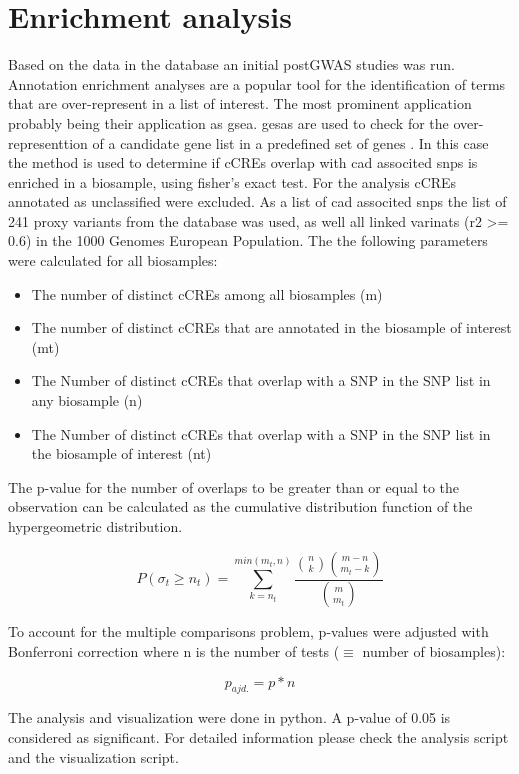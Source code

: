 \section{Enrichment analysis}
\label{sec:enrichment}
Based on the data in the database an initial postGWAS studies was run. Annotation enrichment analyses are a popular tool for the identification of terms that are over-represent in a list of interest. The most prominent application probably being their application as \ac{gsea}. \acp{gesa} are used to check for the over-representtion of a candidate gene list in a predefined set of genes \cite{tipneyIntroductionEffectiveUse2010}. In this case the method is used to determine if \acp{cCRE} overlap with \ac{cad} associted \acp{snp} is enriched in a biosample, using fisher's exact test.
For the analysis \acp{cCRE} annotated as unclassified were excluded. As a list of \ac{cad} associted \acp{snp} the list of 241 proxy variants from the database was used, as well all linked varinats (r2 >= 0.6) in the 1000 Genomes European Population. The the following parameters were calculated for all biosamples:

\begin{itemize}
    \item The number of distinct cCREs among all biosamples (m)
    \item The number of distinct cCREs that are annotated in the biosample of interest (mt)
    \item The Number of distinct cCREs that overlap with a SNP in the SNP list in any biosample (n)
    \item The Number of distinct cCREs that overlap with a SNP in the SNP list in the biosample of interest (nt)
\end{itemize}

The p-value for the number of overlaps to be greater than or equal to the observation can be calculated as the cumulative distribution function of the hypergeometric distribution.

$$ P(\sigma_t\geq n_t) = \sum_{k=n_t}^{min(m_t, n)} \frac{\binom{n}{k}\binom{m-n}{m_t-k}}{\binom{m}{m_t}} $$

To account for the multiple comparisons problem, p-values were adjusted with Bonferroni correction where n is the number of tests ($\equiv$ number of biosamples):

$$ p_{ajd.} = p*n$$

The analysis and visualization were done in python. A p-value of 0.05 is considered as significant. For detailed information please check the analysis script and the visualization script.

